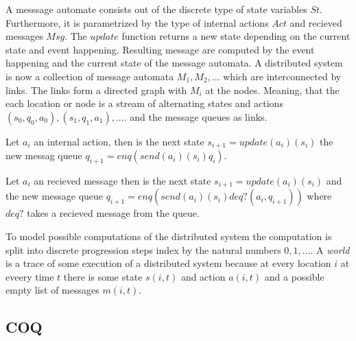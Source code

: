 A messsage automate consists out of the discrete type of state variables
$St$. Furthermore, it is parametrized by the type of internal actions $Act$ 
and recieved messages $Msg$. The $update$ function returns a new state
depending on the current state and event happening. Resulting message are
computed by the event happening and the current state of the message automata.
A distributed system is now a collection of message automata $M_1,M_2,...$ which
are interconnected by links. The links form a directed graph with $M_i$ at the
nodes. Meaning, that the each location or node is a stream of alternating states
and actions $(s_0,q_0,a_0),(s_1,q_1,a_1),....$ and the message queues as links.~\cite{bickford2003logic}

\begin{defi}
  Let $a_i$ an internal action, then is the next state
  $s_{i+1}=update(a_i)(s_i)$ the new messag queue $q_{i+1}=enq(send(a_i)(s_i)q_i)$.
\end{defi}

\begin{defi}
  Let $a_i$ an recieved message then is the next state
  $s_{i+1}=update(a_i)(s_i)$ and the new message queue
  $q_{i+1}=enq(send(a_i)(s_i)deq?(a_i,q_{i+1}))$ where $deq?$ takes
  a recieved message from the queue. 
\end{defi}

To model possible computations of the distributed system the computation
is split into discrete progression steps index by the natural numbers $0,1,...$.
A \textit{world} is a trace of some execution of a distributed system because
at every location $i$ at eveery time $t$ there is some state $s(i,t)$ and action
$a(i,t)$ and a possible empty list of messages $m(i,t)$.


\subsection{COQ}

